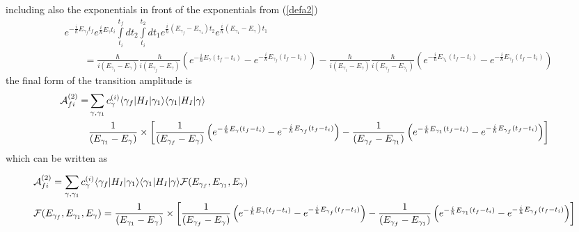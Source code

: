 including also the exponentials in front of the exponentials from (\ref{defa2})
\begin{align}
  & e^{-\frac{i}{\hbar}E_{\gamma_f} t_f}e^{\frac{i}{\hbar}E_{\gamma} t_i}\int\limits_{t_i}^{t_f}dt_2\int\limits_{t_i}^{t_2}dt_1e^{\frac{i}{\hbar}(E_{\gamma_f}-E_{\gamma_1})t_2}e^{\frac{i}{\hbar}(E_{\gamma_1}-E_{\gamma})t_1}\nonumber                                                                                                                                      \\
  & \qquad =\frac{\hbar}{i(E_{\gamma_1}-E_{\gamma})}\frac{\hbar}{i(E_{\gamma_f}-E_{\gamma})}\left(e^{-\frac{i}{\hbar}E_{\gamma}(t_f-t_i)}-e^{-\frac{i}{\hbar}E_{\gamma_f}(t_f-t_i)}\right)-\frac{\hbar}{i(E_{\gamma_1}-E_{\gamma})}\frac{\hbar}{i(E_{\gamma_f}-E_{\gamma_1})}\left(e^{-\frac{i}{\hbar}E_{\gamma_1}(t_f-t_i)}-e^{-\frac{i}{\hbar}E_{\gamma_f}(t_f-t_i)}\right)
\end{align}
the final form of the transition amplitude is
\begin{align}
  {\cal A}_{fi}^{(2)} = & \sum_{\gamma, \gamma_1} c_{\gamma}^{(i)}\langle\gamma_f|H_I|\gamma_1\rangle \langle\gamma_1|H_I|\gamma\rangle\nonumber                                                                                                                                                                  \\
  & \frac{1}{(E_{\gamma_1}-E_{\gamma})} \times\left[ \frac{1}{(E_{\gamma_f}-E_{\gamma})}\left(e^{-\frac{i}{\hbar}E_{\gamma}(t_f-t_i)}-e^{-\frac{i}{\hbar}E_{\gamma_f}(t_f-t_i)}\right)-\frac{1}{(E_{\gamma_f}-E_{\gamma_1})}\left(e^{-\frac{i}{\hbar}E_{\gamma_1}(t_f-t_i)}-e^{-\frac{i}{\hbar}E_{\gamma_f}(t_f-t_i)}\right) \right]
\end{align}
which can be written as
\begin{importantbox}
  \begin{align}
    &{\cal A}_{fi}^{(2)} =  \sum_{\gamma, \gamma_1} c_{\gamma}^{(i)}\langle\gamma_f|H_I|\gamma_1\rangle \langle\gamma_1|H_I|\gamma\rangle{\cal F}(E_{\gamma_f}, E_{\gamma_1},E_\gamma)\nonumber                                                                                                                                                                  \\
    & {\cal F}(E_{\gamma_f}, E_{\gamma_1},E_\gamma) = \frac{1}{(E_{\gamma_1}-E_{\gamma})} \times\left[ \frac{1}{(E_{\gamma_f}-E_{\gamma})}\left(e^{-\frac{i}{\hbar}E_{\gamma}(t_f-t_i)}-e^{-\frac{i}{\hbar}E_{\gamma_f}(t_f-t_i)}\right)-\frac{1}{(E_{\gamma_f}-E_{\gamma_1})}\left(e^{-\frac{i}{\hbar}E_{\gamma_1}(t_f-t_i)}-e^{-\frac{i}{\hbar}E_{\gamma_f}(t_f-t_i)}\right) \right]\label{transition-second-order}
  \end{align}

\end{importantbox}